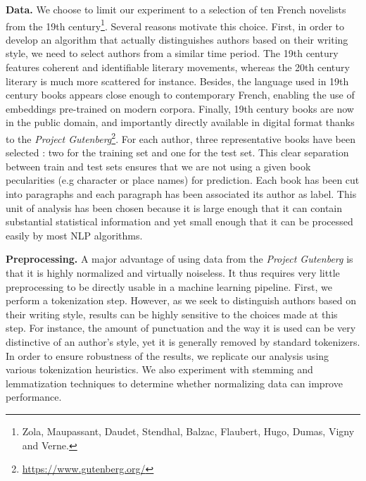 \documentclass[11pt,a4paper]{article}
\begin{document}
\textbf{Data.} We choose to limit our experiment to a selection of ten French novelists from the 19th century\footnote{Zola, Maupassant, Daudet, Stendhal, Balzac, Flaubert, Hugo, Dumas, Vigny and Verne.}. Several reasons motivate this choice. First, in order to develop an algorithm that actually distinguishes authors based on their writing style, we need to select authors from a similar time period. The 19th century features coherent and identifiable literary movements, whereas the 20th century literary is much more scattered for instance. Besides, the language used in 19th century books appears close enough to contemporary French, enabling the use of embeddings pre-trained on modern corpora. Finally, 19th century books are now in the public domain, and importantly directly available in digital format thanks to the \textit{Project Gutenberg}\footnote{\url{https://www.gutenberg.org/}}. For each author, three representative books have been selected : two for the training set and one for the test set. This clear separation between train and test sets ensures that we are not using a given book pecularities (e.g character or place names) for prediction. Each book has been cut into paragraphs and each paragraph has been associated its author as label. This unit of analysis has been chosen because it is large enough that it can contain substantial statistical information and yet small enough that it can be processed easily by most NLP algorithms.

\textbf{Preprocessing.} A major advantage of using data from the \textit{Project Gutenberg} is that it is highly normalized and virtually noiseless. It thus requires very little preprocessing to be directly usable in a machine learning pipeline. First, we perform a tokenization step. However, as we seek to distinguish authors based on their writing style, results can be highly sensitive to the choices made at this step. For instance, the amount of punctuation and the way it is used can be very distinctive of an author's style, yet it is generally removed by standard tokenizers. In order to ensure robustness of the results, we replicate our analysis using various tokenization heuristics. We also experiment with stemming and lemmatization techniques to determine whether normalizing data can improve performance.
\end{document}
